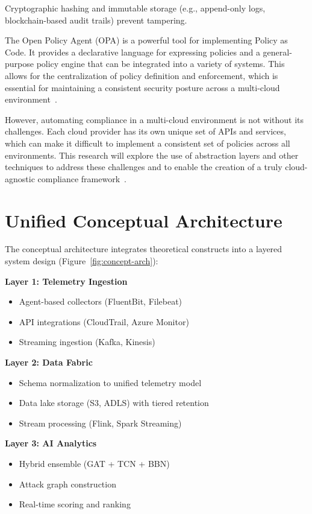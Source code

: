 Cryptographic hashing and immutable storage (e.g., append-only logs, blockchain-based audit trails) prevent tampering.

The Open Policy Agent (OPA) is a powerful tool for implementing Policy as Code. It provides a declarative language for expressing policies and a general-purpose policy engine that can be integrated into a variety of systems. This allows for the centralization of policy definition and enforcement, which is essential for maintaining a consistent security posture across a multi-cloud environment~\cite{firefly2024opa}.

However, automating compliance in a multi-cloud environment is not without its challenges. Each cloud provider has its own unique set of APIs and services, which can make it difficult to implement a consistent set of policies across all environments. This research will explore the use of abstraction layers and other techniques to address these challenges and to enable the creation of a truly cloud-agnostic compliance framework~\cite{puppet2024multicloud}.

\section{Unified Conceptual Architecture}\label{sec:theory-arch}
The conceptual architecture integrates theoretical constructs into a layered system design (Figure~\ref{fig:concept-arch}):

\textbf{Layer 1: Telemetry Ingestion}
\begin{itemize}
    \item Agent-based collectors (FluentBit, Filebeat)
    \item API integrations (CloudTrail, Azure Monitor)
    \item Streaming ingestion (Kafka, Kinesis)
\end{itemize}

\textbf{Layer 2: Data Fabric}
\begin{itemize}
    \item Schema normalization to unified telemetry model
    \item Data lake storage (S3, ADLS) with tiered retention
    \item Stream processing (Flink, Spark Streaming)
\end{itemize}

\textbf{Layer 3: AI Analytics}
\begin{itemize}
    \item Hybrid ensemble (GAT + TCN + BBN)
    \item Attack graph construction
    \item Real-time scoring and ranking
\end{itemize}

